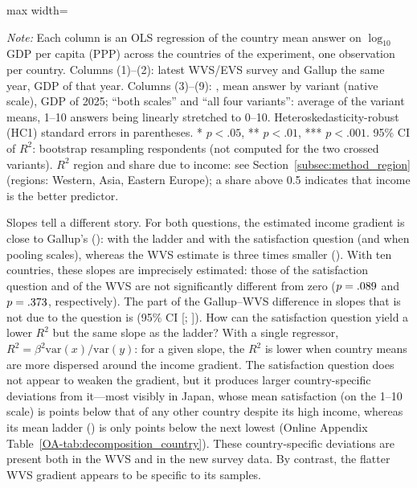 \documentclass[12pt]{article}
\begin{document}
\begin{table}[htbp]
    \centering
    \begin{adjustbox}{max width=\textwidth}
    
    \end{adjustbox}
    \caption{Relation between GDP per capita and national well-being in the ten countries of the experiment: past vs.\ new data.}\label{tab:ten_countries}
    \begin{minipage}{\textwidth}\footnotesize \textit{Note:} Each column is an OLS regression of the country mean answer on $\log_{10}$ GDP per capita (PPP) across the \nDecompCountries countries of the experiment, one observation per country. Columns (1)--(2): latest WVS/EVS survey and Gallup the same year, GDP of that year. Columns (3)--(9): \newsurvey, mean answer by variant (native scale), GDP of 2025; ``both scales'' and ``all four variants'': average of the variant means, 1--10 answers being linearly stretched to 0--10. Heteroskedasticity-robust (HC1) standard errors in parentheses. * $p<.05$, ** $p<.01$, *** $p<.001$. 95\% CI of $R^2$: bootstrap resampling respondents (not computed for the two crossed variants). $R^2$ region and share due to income: see Section~\ref{subsec:method_region} (regions: Western, Asia, Eastern Europe); a share above 0.5 indicates that income is the better predictor.\end{minipage}
\end{table}

Slopes tell a different story. For both questions, the estimated income gradient is close to Gallup's (\slopeTenGallup): \slopeTenFabreLadder with the ladder and \slopeTenFabreSatisfaction with the satisfaction question (\slopeTenFabreLadderPooled and \slopeTenFabreSatisfactionPooled when pooling scales), whereas the WVS estimate is three times smaller (\slopeTenWVS). With ten countries, these slopes are imprecisely estimated: those of the satisfaction question and of the WVS are not significantly different from zero ($p = .089$ and $p = .373$, respectively). The part of the Gallup--WVS difference in slopes that is not due to the question is \SlopeDiffinDiff (95\% CI [\SlopeDiffinDiffLow; \SlopeDiffinDiffHigh]). How can the satisfaction question yield a lower $R^2$ but the same slope as the ladder? With a single regressor, $R^2 = \beta^2 \mathrm{var}(x)/\mathrm{var}(y)$: for a given slope, the $R^2$ is lower when country means are more dispersed around the income gradient. The satisfaction question does not appear to weaken the gradient, but it produces larger country-specific deviations from it---most visibly in Japan, whose mean satisfaction (\meanSatisfactionJPN on the 1--10 scale) is \gapSatisfactionJPN points below that of any other country despite its high income, whereas its mean ladder (\meanLadderJPN) is only \gapLadderJPN points below the next lowest (Online Appendix Table~\ref{OA-tab:decomposition_country}). These country-specific deviations are present both in the WVS and in the new survey data. By contrast, the flatter WVS gradient appears to be specific to its samples.
\end{document}
